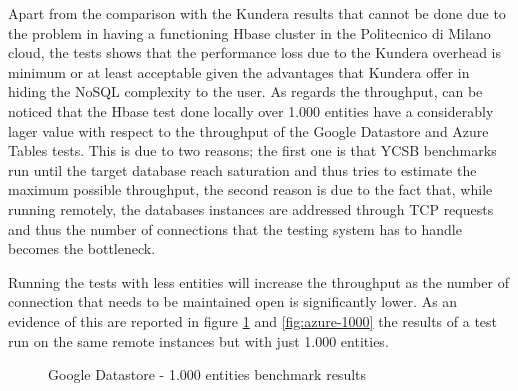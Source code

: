 \newparagraph Apart from the comparison with the Kundera results that cannot be done due to the problem in having a functioning Hbase cluster in the Politecnico di Milano cloud, the tests shows that the performance loss due to the Kundera overhead is minimum or at least acceptable given the advantages that Kundera offer in hiding the NoSQL complexity to the user.
As regards the throughput, can be noticed that the Hbase test done locally over 1.000 entities have a considerably lager value with respect to the throughput of the Google Datastore and Azure Tables tests. This is due to two reasons; the first one is that YCSB benchmarks run until the target database reach saturation and thus tries to estimate the maximum possible throughput, the second reason is due to the fact that, while running remotely, the databases instances are addressed through TCP requests and thus the number of connections that the testing system has to handle becomes the bottleneck. 

\noindent Running the tests with less entities will increase the throughput as the number of connection that needs to be maintained open is significantly lower.
As an evidence of this are reported in figure \ref{fig:gae-1000} and \ref{fig:azure-1000} the results of a test run on the same remote instances but with just 1.000 entities.   

\begin{figure}[tbh]
  \centering
  \qquad
  \caption{Google Datastore - 1.000 entities benchmark results}
  \label{fig:gae-1000}
\end{figure} 

